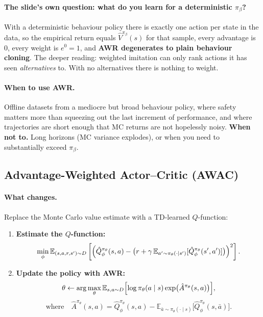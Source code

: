 \documentclass[11pt,a4paper]{article}
\begin{document}
\paragraph{The slide's own question: what do you learn for a deterministic
$\pi_\beta$?} With a deterministic behaviour policy there is exactly one
action per state in the data, so the empirical return equals
$\hat V^{\pi_\beta}(s)$ for that sample, every advantage is $0$, every weight
is $e^{0}=1$, and \textbf{AWR degenerates to plain behaviour cloning}. The
deeper reading: weighted imitation can only rank actions it has seen
\emph{alternatives} to. With no alternatives there is nothing to weight.

\paragraph{When to use AWR.} Offline datasets from a mediocre but broad
behaviour policy, where safety matters more than squeezing out the last
increment of performance, and where trajectories are short enough that MC
returns are not hopelessly noisy.
\textbf{When not to.} Long horizons (MC variance explodes), or when you need
to substantially exceed $\pi_\beta$.

\subsection{Advantage-Weighted Actor--Critic (AWAC)}

\paragraph{What changes.} Replace the Monte Carlo value estimate with a TD-learned
$Q$-function:
\begin{enumerate}[label=\arabic*.]
\item \textbf{Estimate the $Q$-function:}
\[
\min_\phi \mathbb E_{(s,a,r,s')\sim D}\left[\Bigl(\hat Q^{\pi_\theta}_\phi(s,a)-\bigl(r+\gamma\,\mathbb E_{a'\sim\pi_\theta(\cdot\mid s')}[\hat Q^{\pi_\theta}_\phi(s',a')]\bigr)\Bigr)^2\right].
\]
\item \textbf{Update the policy with AWR:}
\[
\theta\leftarrow\arg\max_\theta \mathbb E_{s,a\sim D}\Bigl[\log\pi_\theta(a\mid s)\exp\bigl(\hat A^{\pi_\theta}(s,a)\bigr)\Bigr],
\]
\[
\text{where}\quad
\hat A^{\pi_\theta}(s,a)=\hat Q^{\pi_\theta}_\phi(s,a)-\mathbb E_{\bar a\sim\pi_\theta(\cdot\mid s)}\bigl[\hat Q^{\pi_\theta}_\phi(s,\bar a)\bigr].
\]
\end{enumerate}
\end{document}
